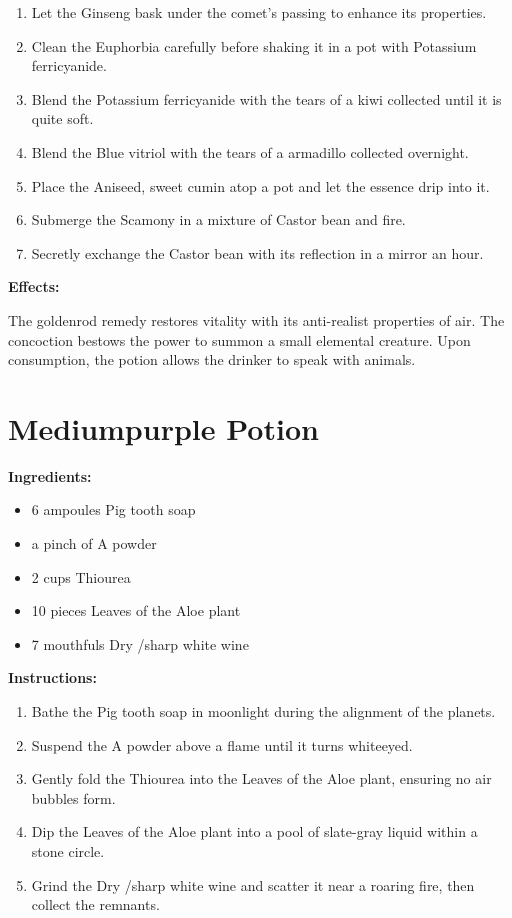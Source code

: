 \documentclass{article}
\begin{document}
\begin{enumerate}
  \item Let the Ginseng bask under the comet’s passing to enhance its properties.
  \item Clean the Euphorbia carefully before shaking it in a pot with Potassium ferricyanide.
  \item Blend the Potassium ferricyanide with the tears of a kiwi collected until it is quite soft.
  \item Blend the Blue vitriol with the tears of a armadillo collected overnight.
  \item Place the Aniseed, sweet cumin atop a pot and let the essence drip into it.
  \item Submerge the Scamony in a mixture of Castor bean and fire.
  \item Secretly exchange the Castor bean with its reflection in a mirror an hour.
\end{enumerate}

\textbf{Effects:}

The goldenrod remedy restores vitality with its anti-realist properties of air. The concoction bestows the power to summon a small elemental creature. Upon consumption, the potion allows the drinker to speak with animals.

\newpage
\section*{Mediumpurple Potion}

\textbf{Ingredients:}

\begin{itemize}
  \item 6 ampoules Pig tooth soap
  \item a pinch of A powder
  \item 2 cups Thiourea
  \item 10 pieces Leaves of the Aloe plant
  \item 7 mouthfuls Dry /sharp white wine
\end{itemize}

\textbf{Instructions:}

\begin{enumerate}
  \item Bathe the Pig tooth soap in moonlight during the alignment of the planets.
  \item Suspend the A powder above a flame until it turns whiteeyed.
  \item Gently fold the Thiourea into the Leaves of the Aloe plant, ensuring no air bubbles form.
  \item Dip the Leaves of the Aloe plant into a pool of slate-gray liquid within a stone circle.
  \item Grind the Dry /sharp white wine and scatter it near a roaring fire, then collect the remnants.
\end{enumerate}
\end{document}

